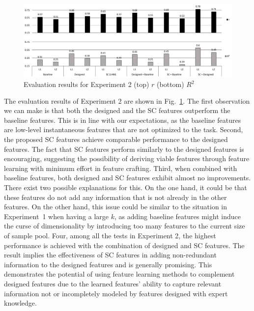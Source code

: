 \documentclass[conference]{IEEEtran}
\begin{document}

\begin{figure}
\centering
\includegraphics[width = 17.2 cm]{./figs/exp2_remake.pdf}
\caption{Evaluation results for Experiment 2 (top) $r$ (bottom) $R^{2}$}
\label{fig:exp2}
\end{figure}




The evaluation results of Experiment 2 are shown in Fig.~\ref{fig:exp2}. The first observation we can make is that both the designed and the SC features outperform the baseline features. This is in line with our expectations, as the baseline features are low-level instantaneous features that are not optimized to the task. %
Second, the proposed SC features achieve comparable performance to the designed features. The fact that SC features perform similarly to the designed features is encouraging, suggesting the possibility of deriving viable features through feature learning with minimum effort in feature crafting. 
Third, when combined with baseline features, both designed and SC features exhibit almost no improvements. There exist two possible explanations for this. On the one hand, it could be that these features do not add any information that is not already in the other features. On the other hand, this issue could be similar to the situation in Experiment~1 when having a large $k$, as adding baseline features might induce the curse of dimensionality by introducing too many features to the current size of sample pool. %
Four, among all the tests in Experiment 2, the highest performance is achieved with the combination of designed and SC features. The result implies the effectiveness of SC features in adding non-redundant information to the designed features and is generally promising. This demonstrates the potential of using feature learning methods to complement designed features due to the learned features' ability to capture relevant information not or incompletely modeled by features designed with expert knowledge.
\end{document}
